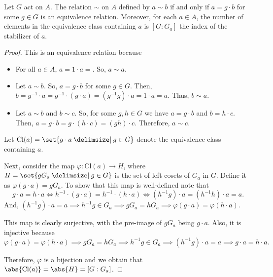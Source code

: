 \documentclass[11pt]{penrose}
\begin{document}
\begin{nprop}
    Let $G$ act on $A$. The relation $\sim$ on $A$ defined by $a \sim b$ if and only if $a = g \cdot b$ for some $g \in G$ is an equivalence relation. Moreover, for each $a \in A$, the number of elements in the equivalence class containing $a$ is $[G : G_{a}]$ the index of the stabilizer of $a$.
\end{nprop}
\begin{proof}
    This is an equivalence relation because
    \begin{itemize}
        \item For all $a \in A$, $a = 1 \cdot a =$. So, $a \sim a$.
        \item Let $a \sim b$. So, $a = g \cdot b$ for some $g \in G$. Then, $b = g^{-1} \cdot a = g^{-1} \cdot (g \cdot a) = (g^{-1}g) \cdot a = 1 \cdot a = a$. Thus, $b \sim a$.
        \item Let $a \sim b$ and $b \sim c$. So, for some $g, h \in G$ we have $a = g \cdot b$ and $b = h \cdot c$. Then, $a = g \cdot b = g \cdot (h \cdot c) = (gh) \cdot c$. Therefore, $a \sim c$.
    \end{itemize}
    Let $\mathrm{Cl}(a) = \set{g \cdot a \st g \in G}$ denote the equivalence class containing $a$.

    Next, consider the map $\varphi : \mathrm{Cl}(a) \to H$, where $H = \set{gG_{a} \st g \in G}$ is the set of left cosets of $G_{a}$ in $G$. Define it as $\varphi(g \cdot a) = g G_{a}$. To show that this map is well-defined note that
    \begin{equation*}
        g \cdot a = h \cdot a
        \iff h^{-1} \cdot (g \cdot a) = h^{-1} \cdot (h \cdot a)
        \iff (h^{-1} g) \cdot a = (h^{-1} h) \cdot a = a.
    \end{equation*}
    And, $(h^{-1} g) \cdot a = a \implies h^{-1} g \in G_{a} \implies gG_{a} = hG_{a} \implies \varphi(g \cdot a) = \varphi(h \cdot a)$.

    This map is clearly surjective, with the pre-image of $gG_{a}$ being $g \cdot a$. Also, it is injective because
    \begin{equation*}
        \varphi(g \cdot a) = \varphi(h \cdot a)
        \implies gG_{a} = hG_{a}
        \implies h^{-1}g \in G_{a}
        \implies (h^{-1}g) \cdot a = a
        \implies g \cdot a = h \cdot a.
    \end{equation*}

    Therefore, $\varphi$ is a bijection and we obtain that $\abs{\mathrm{Cl}(a)} = \abs{H} = [G : G_{a}]$.
\end{proof}
\end{document}
